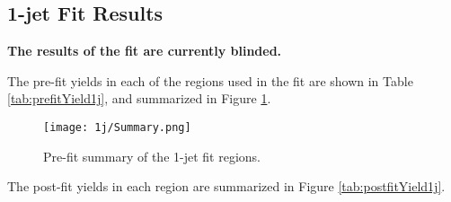 \subsection{1-jet Fit Results}

\textbf{The results of the fit are currently blinded.} 

The pre-fit yields in each of the regions used in the fit are shown in Table \ref{tab:prefitYield1j}, and summarized in Figure \ref{fig:prefitSummary_1j}.

\hspace{-1in}\begin{table}[H]
\begin{adjustwidth}{-3em}{-3em}
\small

\label{tab:prefitYield1j}
\caption{Pre-fit yields in each of the 1-jet fit regions.}
\end{adjustwidth}
\end{table}

\begin{figure}[H]
  \center
  \texttt{[image: 1j/Summary.png]}
  \caption{Pre-fit summary of the 1-jet fit regions.}
  \label{fig:prefitSummary_1j}
\end{figure}


The post-fit yields in each region are summarized in Figure \ref{tab:postfitYield1j}.

\hspace{-1in}\begin{table}[H]
\begin{adjustwidth}{-3em}{-3em}

\label{tab:postfitYield1j}
\caption{Post-fit yields in each of the 1-jet fit regions.}                                                                 
\end{adjustwidth} 
\end{table}

